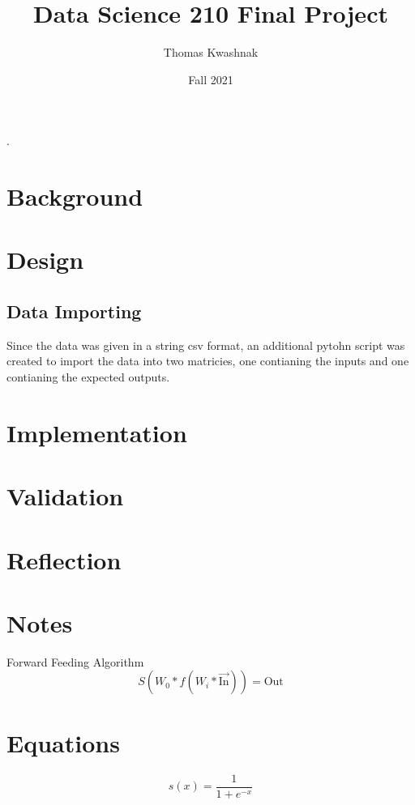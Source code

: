 \documentclass[10pt]{article}
\title{Data Science 210 Final Project}
\author{Thomas Kwashnak}
\date{Fall 2021}
\begin{document}
\maketitle
\setlength{\parindent}{0pt}.
\setlength{\parskip}{\baselineskip}
\lstset{numbers=left, numberstyle=\footnotesize, frame=l} 


\section{Background}
\section{Design}



\subsection{Data Importing}
Since the data was given in a string csv format, an additional pytohn script was created to import the data into two matricies, one contianing the inputs and one contianing the expected outputs.


\section{Implementation}
\section{Validation}
\section{Reflection}

\section{Notes}
Forward Feeding Algorithm
$$S(W_0 * f(W_i * \vec{\text{In}})) = \text{Out}$$

\section{Equations}
$$s(x) = \frac{1}{1 + e^{-x}}$$
\end{document}
